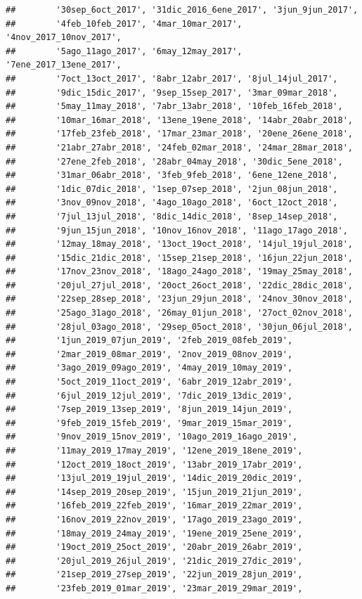 \documentclass[
]{book}
\begin{document}
\begin{verbatim}
##        '30sep_6oct_2017', '31dic_2016_6ene_2017', '3jun_9jun_2017',
##        '4feb_10feb_2017', '4mar_10mar_2017', '4nov_2017_10nov_2017',
##        '5ago_11ago_2017', '6may_12may_2017', '7ene_2017_13ene_2017',
##        '7oct_13oct_2017', '8abr_12abr_2017', '8jul_14jul_2017',
##        '9dic_15dic_2017', '9sep_15sep_2017', '3mar_09mar_2018',
##        '5may_11may_2018', '7abr_13abr_2018', '10feb_16feb_2018',
##        '10mar_16mar_2018', '13ene_19ene_2018', '14abr_20abr_2018',
##        '17feb_23feb_2018', '17mar_23mar_2018', '20ene_26ene_2018',
##        '21abr_27abr_2018', '24feb_02mar_2018', '24mar_28mar_2018',
##        '27ene_2feb_2018', '28abr_04may_2018', '30dic_5ene_2018',
##        '31mar_06abr_2018', '3feb_9feb_2018', '6ene_12ene_2018',
##        '1dic_07dic_2018', '1sep_07sep_2018', '2jun_08jun_2018',
##        '3nov_09nov_2018', '4ago_10ago_2018', '6oct_12oct_2018',
##        '7jul_13jul_2018', '8dic_14dic_2018', '8sep_14sep_2018',
##        '9jun_15jun_2018', '10nov_16nov_2018', '11ago_17ago_2018',
##        '12may_18may_2018', '13oct_19oct_2018', '14jul_19jul_2018',
##        '15dic_21dic_2018', '15sep_21sep_2018', '16jun_22jun_2018',
##        '17nov_23nov_2018', '18ago_24ago_2018', '19may_25may_2018',
##        '20jul_27jul_2018', '20oct_26oct_2018', '22dic_28dic_2018',
##        '22sep_28sep_2018', '23jun_29jun_2018', '24nov_30nov_2018',
##        '25ago_31ago_2018', '26may_01jun_2018', '27oct_02nov_2018',
##        '28jul_03ago_2018', '29sep_05oct_2018', '30jun_06jul_2018',
##        '1jun_2019_07jun_2019', '2feb_2019_08feb_2019',
##        '2mar_2019_08mar_2019', '2nov_2019_08nov_2019',
##        '3ago_2019_09ago_2019', '4may_2019_10may_2019',
##        '5oct_2019_11oct_2019', '6abr_2019_12abr_2019',
##        '6jul_2019_12jul_2019', '7dic_2019_13dic_2019',
##        '7sep_2019_13sep_2019', '8jun_2019_14jun_2019',
##        '9feb_2019_15feb_2019', '9mar_2019_15mar_2019',
##        '9nov_2019_15nov_2019', '10ago_2019_16ago_2019',
##        '11may_2019_17may_2019', '12ene_2019_18ene_2019',
##        '12oct_2019_18oct_2019', '13abr_2019_17abr_2019',
##        '13jul_2019_19jul_2019', '14dic_2019_20dic_2019',
##        '14sep_2019_20sep_2019', '15jun_2019_21jun_2019',
##        '16feb_2019_22feb_2019', '16mar_2019_22mar_2019',
##        '16nov_2019_22nov_2019', '17ago_2019_23ago_2019',
##        '18may_2019_24may_2019', '19ene_2019_25ene_2019',
##        '19oct_2019_25oct_2019', '20abr_2019_26abr_2019',
##        '20jul_2019_26jul_2019', '21dic_2019_27dic_2019',
##        '21sep_2019_27sep_2019', '22jun_2019_28jun_2019',
##        '23feb_2019_01mar_2019', '23mar_2019_29mar_2019',

\end{verbatim}
\end{document}
